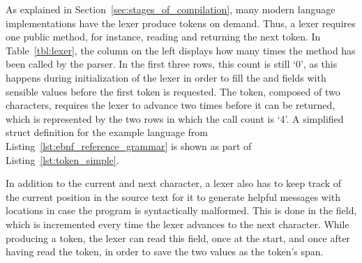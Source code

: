 \begin{table}[h]
\end{table}

As explained in Section~\ref{sec:stages_of_compilation}, many modern language implementations have the lexer produce tokens on demand.
Thus, a lexer requires one public method,  for instance, reading and returning the next token.
In Table~\ref{tbl:lexer}, the column on the left displays how many times the  method has been called by the parser.
In the first three rows, this count is still `0', as this happens during initialization of the lexer in order to fill the  and  fields with sensible values before the first token is requested.
The  token, composed of two \qVerb{*} characters, requires the lexer to advance two times before it can be returned, which is represented by the two rows in which the call count is `4'.
A simplified  struct definition for the example language from Listing~\ref{lst:ebnf_reference_grammar} is shown as part of Listing~\ref{lst:token_simple}.

In addition to the current and next character, a lexer also has to keep track of the current position in the source text for it to generate helpful messages with locations in case the program is syntactically malformed.
This is done in the  field, which is incremented every time the lexer advances to the next character.
While producing a token, the lexer can read this field, once at the start, and once after having read the token, in order to save the two values as the token's span.

